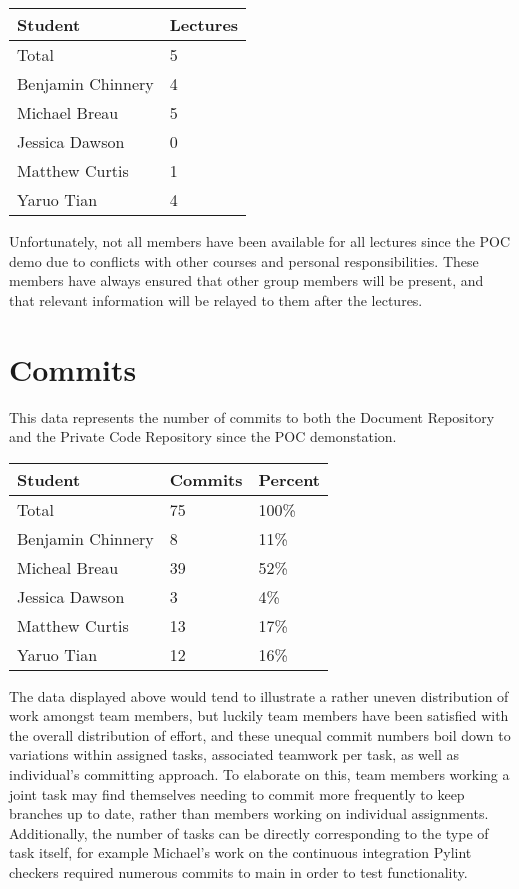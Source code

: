 \documentclass{article}
\begin{document}
\begin{table}[H]
\centering
\begin{tabular}{ll}
\toprule
\textbf{Student} & \textbf{Lectures}\\
\midrule
Total & 5\\
Benjamin Chinnery & 4\\
Michael Breau & 5\\
Jessica Dawson & 0\\
Matthew Curtis & 1\\
Yaruo Tian & 4\\
\bottomrule
\end{tabular}
\end{table}

Unfortunately, not all members have been available for all lectures since the POC demo due to conflicts with other courses and personal responsibilities. These members have always ensured that other group members will be present, and that relevant information will be relayed to them after the lectures.

\section{Commits}

This data represents the number of commits to both the Document Repository and the Private Code Repository since the POC demonstation. 
\begin{table}[H]
\centering
\begin{tabular}{lll}
\toprule
\textbf{Student} & \textbf{Commits} & \textbf{Percent}\\
\midrule
Total & 75 & 100\% \\
Benjamin Chinnery & 8 & 11\%\\
Micheal Breau & 39 & 52\%\\
Jessica Dawson & 3 & 4\%\\
Matthew Curtis & 13 & 17\%\\
Yaruo Tian & 12 & 16\%\\
\bottomrule
\end{tabular}
\end{table}

The data displayed above would tend to illustrate a rather uneven distribution of work amongst team members, but luckily team members have been satisfied with the overall distribution of effort, and these unequal commit numbers boil down to variations within assigned tasks, associated teamwork per task, as well as individual's committing approach. To elaborate on this, team members working a joint task may find themselves needing to commit more frequently to keep branches up to date, rather than members working on individual assignments. Additionally, the number of tasks can be directly corresponding to the type of task itself, for example Michael's work on the continuous integration Pylint checkers required numerous commits to main in order to test functionality.
\end{document}
